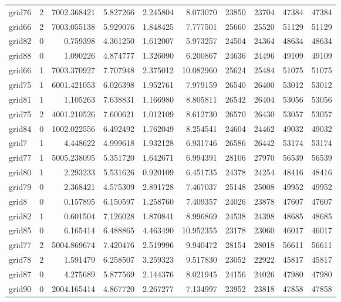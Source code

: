 \begin{longtable}{|l|r|r|r|r|r|r|r|r|r|}
grid76 & 2 & 7002.368421 & 5.827266 & 2.245804 & 8.073070 & 23850 & 23704 & 47384 & 47384 \\
grid66 & 2 & 7003.055138 & 5.929076 & 1.848425 & 7.777501 & 25660 & 25520 & 51129 & 51129 \\
grid82 & 0 & 0.759398 & 4.361250 & 1.612007 & 5.973257 & 24504 & 24364 & 48634 & 48634 \\
grid88 & 0 & 1.090226 & 4.874777 & 1.326090 & 6.200867 & 24636 & 24496 & 49109 & 49109 \\
grid66 & 1 & 7003.370927 & 7.707948 & 2.375012 & 10.082960 & 25624 & 25484 & 51075 & 51075 \\
grid75 & 1 & 6001.421053 & 6.026398 & 1.952761 & 7.979159 & 26540 & 26400 & 53012 & 53012 \\
grid81 & 1 & 1.105263 & 7.638831 & 1.166980 & 8.805811 & 26542 & 26404 & 53056 & 53056 \\
grid75 & 2 & 4001.210526 & 7.600621 & 1.012109 & 8.612730 & 26570 & 26430 & 53057 & 53057 \\
grid84 & 0 & 1002.022556 & 6.492492 & 1.762049 & 8.254541 & 24604 & 24462 & 49032 & 49032 \\
grid7 & 1 & 4.448622 & 4.999618 & 1.932128 & 6.931746 & 26586 & 26442 & 53174 & 53174 \\
grid77 & 1 & 5005.238095 & 5.351720 & 1.642671 & 6.994391 & 28106 & 27970 & 56539 & 56539 \\
grid80 & 1 & 2.293233 & 5.531626 & 0.920109 & 6.451735 & 24378 & 24254 & 48416 & 48416 \\
grid79 & 0 & 2.368421 & 4.575309 & 2.891728 & 7.467037 & 25148 & 25008 & 49952 & 49952 \\
grid8 & 0 & 0.157895 & 6.150597 & 1.258760 & 7.409357 & 24026 & 23878 & 47607 & 47607 \\
grid82 & 1 & 0.601504 & 7.126028 & 1.870841 & 8.996869 & 24538 & 24398 & 48685 & 48685 \\
grid85 & 0 & 6.165414 & 6.488865 & 4.463490 & 10.952355 & 23178 & 23060 & 46017 & 46017 \\
grid77 & 2 & 5004.869674 & 7.420476 & 2.519996 & 9.940472 & 28154 & 28018 & 56611 & 56611 \\
grid78 & 2 & 1.591479 & 6.258507 & 3.259323 & 9.517830 & 23052 & 22922 & 45817 & 45817 \\
grid87 & 0 & 4.275689 & 5.877569 & 2.144376 & 8.021945 & 24156 & 24026 & 47980 & 47980 \\
grid90 & 0 & 2004.165414 & 4.867720 & 2.267277 & 7.134997 & 23952 & 23818 & 47858 & 47858 \\

\end{longtable}
